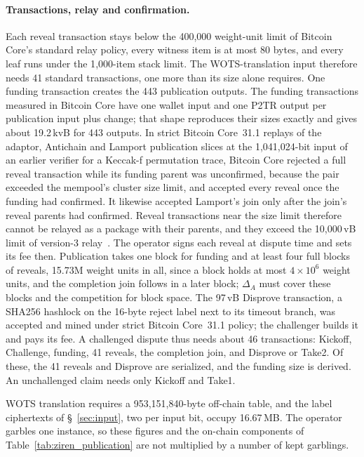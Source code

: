 \documentclass[11pt]{article}
\begin{document}
\paragraph{Transactions, relay and confirmation.} Each reveal transaction
stays below the 400{,}000 weight-unit limit of Bitcoin Core's standard relay
policy, every witness item is at most 80 bytes, and every leaf runs under the
1{,}000-item stack limit. The WOTS-translation input therefore needs 41
standard transactions, one more than its size alone requires. One funding
transaction creates the 443 publication outputs. The funding transactions
measured in Bitcoin Core have one wallet input and one P2TR output per publication
input plus change; that shape reproduces their sizes exactly and gives about
19.2\,kvB for 443 outputs. In strict Bitcoin Core~31.1 replays of the adaptor, Antichain and Lamport publication slices at the 1{,}041{,}024-bit input of an earlier verifier for a Keccak-f permutation trace, Bitcoin Core rejected a full reveal transaction while its funding parent was unconfirmed,
because the pair exceeded the mempool's cluster size limit, and accepted every
reveal once the funding had confirmed. It likewise accepted Lamport's join only
after the join's reveal parents had confirmed. Reveal transactions near the
size limit therefore cannot be relayed as a package with their parents, and
they exceed the 10{,}000\,vB limit of version-3 relay~\cite{bip431}. The
operator signs each reveal at dispute time and sets its fee then.
Publication takes one block for funding and at least four full blocks of
reveals, 15.73M weight units in all, since a block holds at most $4\times10^6$ weight units, and the
completion join follows in a later block; $\Delta_A$ must cover these blocks
and the competition for block space. The 97\,vB Disprove transaction, a SHA256
hashlock on the 16-byte reject label next to its timeout branch, was accepted
and mined under strict Bitcoin Core~31.1 policy; the challenger builds it and pays its
fee. A challenged dispute thus needs about 46 transactions: Kickoff, Challenge,
funding, 41 reveals, the completion join, and Disprove or Take2. Of these, the
41 reveals and Disprove are serialized, and the funding size is derived. An
unchallenged claim needs only Kickoff and Take1.

WOTS translation requires a 953{,}151{,}840-byte off-chain table, and the
label ciphertexts of \S~\ref{sec:input}, two per input bit, occupy
16.67\,MB. The operator garbles one instance, so these figures and the
on-chain components of Table~\ref{tab:ziren_publication} are not multiplied
by a number of kept garblings.
\end{document}
